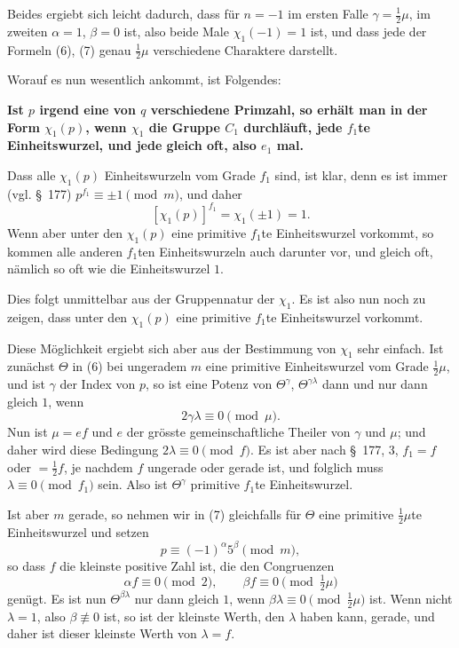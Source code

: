 \documentclass[11pt]{article}
\begin{document}
Beides ergiebt sich leicht dadurch, dass für $n=-1$ im ersten Falle $\gamma=\frac12\mu$, im zweiten $\alpha=1$, $\beta=0$ ist, also beide Male $\chi_1(-1)=1$ ist, und dass jede der Formeln (6), (7) genau $\frac12\mu$ verschiedene Charaktere darstellt.

Worauf es nun wesentlich ankommt, ist Folgendes:
\begin{center}
\textbf{Ist $p$ irgend eine von $q$ verschiedene Primzahl, so erhält man in der Form $\chi_1(p)$, wenn $\chi_1$ die Gruppe $C_1$ durchläuft, jede $f_1$te Einheitswurzel, und jede gleich oft, also $e_1$ mal.}
\end{center}
Dass alle $\chi_1(p)$ Einheitswurzeln vom Grade $f_1$ sind, ist klar, denn es ist immer (vgl. \S~177) $p^{f_1}\equiv\pm1\pmod m$, und daher
\[
[\chi_1(p)]^{f_1}=\chi_1(\pm1)=1.
\]
Wenn aber unter den $\chi_1(p)$ eine primitive $f_1$te Einheitswurzel vorkommt, so kommen alle anderen $f_1$ten Einheitswurzeln auch darunter vor, und gleich oft, nämlich so oft wie die Einheitswurzel $1$.

Dies folgt unmittelbar aus der Gruppennatur der $\chi_1$. Es ist also nun noch zu zeigen, dass unter den $\chi_1(p)$ eine primitive $f_1$te Einheitswurzel vorkommt.

Diese Möglichkeit ergiebt sich aber aus der Bestimmung von $\chi_1$ sehr einfach. Ist zunächst $\Theta$ in (6) bei ungeradem $m$ eine primitive Einheitswurzel vom Grade $\frac12\mu$, und ist $\gamma$ der Index von $p$, so ist eine Potenz von $\Theta^\gamma$, $\Theta^{\gamma\lambda}$ dann und nur dann gleich $1$, wenn
\[
2\gamma\lambda\equiv0\pmod\mu.
\]
Nun ist $\mu=ef$ und $e$ der grösste gemeinschaftliche Theiler von $\gamma$ und $\mu$; und daher wird diese Bedingung $2\lambda\equiv0\pmod f$. Es ist aber nach \S~177, 3, $f_1=f$ oder $=\frac12f$, je nachdem $f$ ungerade oder gerade ist, und folglich muss $\lambda\equiv0\pmod {f_1}$ sein. Also ist $\Theta^\gamma$ primitive $f_1$te Einheitswurzel.

Ist aber $m$ gerade, so nehmen wir in (7) gleichfalls für $\Theta$ eine primitive $\frac12\mu$te Einheitswurzel und setzen
\[
p\equiv(-1)^\alpha5^\beta\pmod m,
\]
so dass $f$ die kleinste positive Zahl ist, die den Congruenzen
\[
\alpha f\equiv0\pmod2,
\qquad
\beta f\equiv0\pmod{\tfrac12\mu}
\]
genügt. Es ist nun $\Theta^{\beta\lambda}$ nur dann gleich $1$, wenn $\beta\lambda\equiv0\pmod{\frac12\mu}$ ist. Wenn nicht $\lambda=1$, also $\beta\not\equiv0$ ist, so ist der kleinste Werth, den $\lambda$ haben kann, gerade, und daher ist dieser kleinste Werth von $\lambda=f$.
\end{document}
